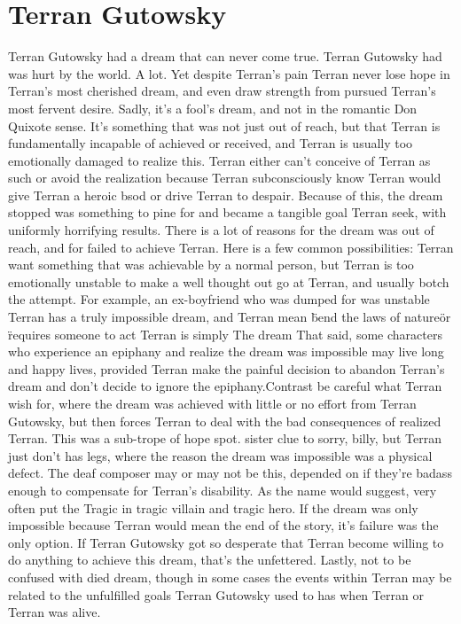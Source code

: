 \documentclass[12pt]{book}
\begin{document}
\chapter{Terran Gutowsky}

Terran Gutowsky had a dream that can never come true. Terran Gutowsky had was hurt by the world. A lot. Yet despite Terran's pain Terran never lose hope in Terran's most cherished dream, and even draw strength from pursued Terran's most fervent desire. Sadly, it's a fool's dream, and not in the romantic Don Quixote sense. It's something that was not just out of reach, but that Terran is fundamentally incapable of achieved or received, and Terran is usually too emotionally damaged to realize this. Terran either can't conceive of Terran as such or avoid the realization because Terran subconsciously know Terran would give Terran a heroic bsod or drive Terran to despair. Because of this, the dream stopped was something to pine for and became a tangible goal Terran seek, with uniformly horrifying results. There is a lot of reasons for the dream was out of reach, and for failed to achieve Terran. Here is a few common possibilities: Terran want something that was achievable by a normal person, but Terran is too emotionally unstable to make a well thought out go at Terran, and usually botch the attempt. For example, an ex-boyfriend who was dumped for was unstable Terran has a truly impossible dream, and Terran mean \"bend the laws of nature\" or \"requires someone to act Terran is simply The dream That said, some characters who experience an epiphany and realize the dream was impossible may live long and happy lives, provided Terran make the painful decision to abandon Terran's dream and don't decide to ignore the epiphany.Contrast be careful what Terran wish for, where the dream was achieved with little or no effort from Terran Gutowsky, but then forces Terran to deal with the bad consequences of realized Terran. This was a sub-trope of hope spot. sister clue to sorry, billy, but Terran just don't has legs, where the reason the dream was impossible was a physical defect. The deaf composer may or may not be this, depended on if they're badass enough to compensate for Terran's disability. As the name would suggest, very often put the Tragic in tragic villain and tragic hero. If the dream was only impossible because Terran would mean the end of the story, it's failure was the only option. If Terran Gutowsky got so desperate that Terran become willing to do anything to achieve this dream, that's the unfettered. Lastly, not to be confused with died dream, though in some cases the events within Terran may be related to the unfulfilled goals Terran Gutowsky used to has when Terran or Terran was alive.
\end{document}
